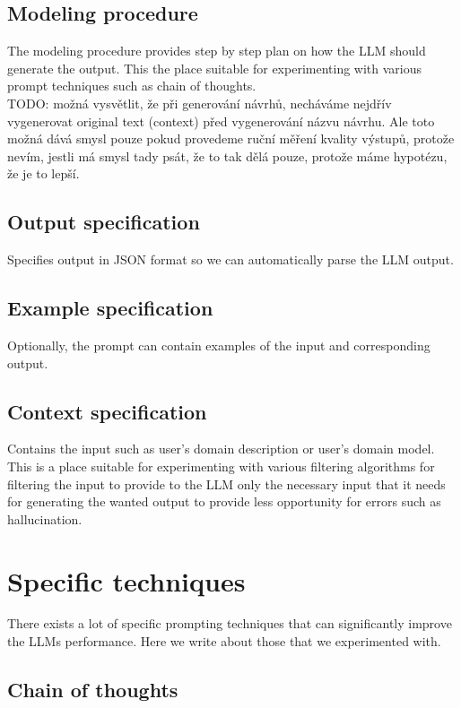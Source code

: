 \subsection{Modeling procedure}
The modeling procedure provides step by step plan on how the LLM should generate the output. This the place suitable for experimenting with various prompt techniques such as chain of thoughts. \\

TODO: možná vysvětlit, že při generování návrhů, necháváme nejdřív vygenerovat original text (context) před vygenerování názvu návrhu. Ale toto možná dává smysl pouze pokud provedeme ruční měření kvality výstupů, protože nevím, jestli má smysl tady psát, že to tak dělá pouze, protože máme hypotézu, že je to lepší.


\subsection{Output specification}
Specifies output in JSON format so we can automatically parse the LLM output.


\subsection{Example specification}
Optionally, the prompt can contain examples of the input and corresponding output.


\subsection{Context specification}
Contains the input such as user's domain description or user's domain model. This is a place suitable for experimenting with various filtering algorithms for filtering the input to provide to the LLM only the necessary input that it needs for generating the wanted output to provide less opportunity for errors such as hallucination.


\section{Specific techniques}

There exists a lot of specific prompting techniques that can significantly improve the LLMs performance. Here we write about those that we experimented with.


\subsection{Chain of thoughts}

